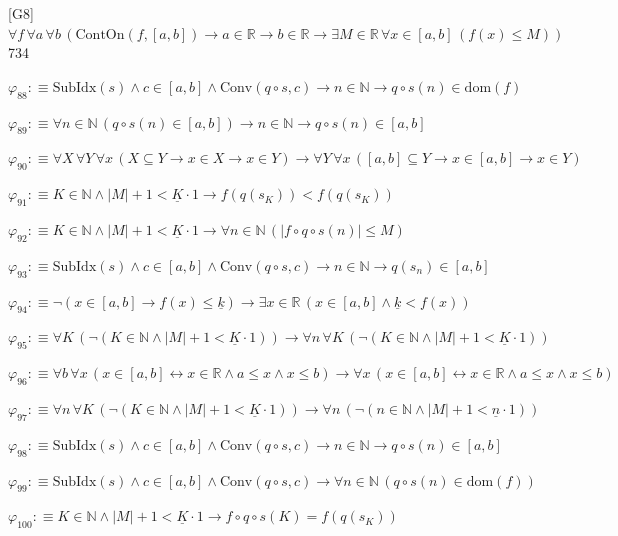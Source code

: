 \begin{fullproof}{[G8]}{$\forall f\,\forall a\,\forall b\,(\mathrm{ContOn}(f,[a,b]) \to a \in \mathbb{R} \to b \in \mathbb{R} \to \exists M \in \mathbb{R}\,\forall x \in [a,b]\,(f(x) \leq M))$}{734}
\begin{abbrevlist}
\item $\varphi_{88} :\equiv \mathrm{SubIdx}(s) \land c \in [a,b] \land \mathrm{Conv}(q \circ s,c) \to n \in \mathbb{N} \to q \circ s(n) \in \mathrm{dom}(f)$
\item $\varphi_{89} :\equiv \forall n \in \mathbb{N}\,(q \circ s(n) \in [a,b]) \to n \in \mathbb{N} \to q \circ s(n) \in [a,b]$
\item $\varphi_{90} :\equiv \forall X\,\forall Y\,\forall x\,(X \subseteq Y \to x \in X \to x \in Y) \to \forall Y\,\forall x\,([a,b] \subseteq Y \to x \in [a,b] \to x \in Y)$
\item $\varphi_{91} :\equiv K \in \mathbb{N} \land \lvert M \rvert + 1 < \underline{K} \cdot 1 \to f(q(s_{K})) < f(q(s_{K}))$
\item $\varphi_{92} :\equiv K \in \mathbb{N} \land \lvert M \rvert + 1 < \underline{K} \cdot 1 \to \forall n \in \mathbb{N}\,(\lvert f \circ q \circ s(n) \rvert \leq M)$
\item $\varphi_{93} :\equiv \mathrm{SubIdx}(s) \land c \in [a,b] \land \mathrm{Conv}(q \circ s,c) \to n \in \mathbb{N} \to q(s_{n}) \in [a,b]$
\item $\varphi_{94} :\equiv \neg (x \in [a,b] \to f(x) \leq \underline{k}) \to \exists x \in \mathbb{R}\,(x \in [a,b] \land \underline{k} < f(x))$
\item $\varphi_{95} :\equiv \forall K\,(\neg (K \in \mathbb{N} \land \lvert M \rvert + 1 < \underline{K} \cdot 1)) \to \forall n\,\forall K\,(\neg (K \in \mathbb{N} \land \lvert M \rvert + 1 < \underline{K} \cdot 1))$
\item $\varphi_{96} :\equiv \forall b\,\forall x\,(x \in [a,b] \leftrightarrow x \in \mathbb{R} \land a \leq x \land x \leq b) \to \forall x\,(x \in [a,b] \leftrightarrow x \in \mathbb{R} \land a \leq x \land x \leq b)$
\item $\varphi_{97} :\equiv \forall n\,\forall K\,(\neg (K \in \mathbb{N} \land \lvert M \rvert + 1 < \underline{K} \cdot 1)) \to \forall n\,(\neg (n \in \mathbb{N} \land \lvert M \rvert + 1 < \underline{n} \cdot 1))$
\item $\varphi_{98} :\equiv \mathrm{SubIdx}(s) \land c \in [a,b] \land \mathrm{Conv}(q \circ s,c) \to n \in \mathbb{N} \to q \circ s(n) \in [a,b]$
\item $\varphi_{99} :\equiv \mathrm{SubIdx}(s) \land c \in [a,b] \land \mathrm{Conv}(q \circ s,c) \to \forall n \in \mathbb{N}\,(q \circ s(n) \in \mathrm{dom}(f))$
\item $\varphi_{100} :\equiv K \in \mathbb{N} \land \lvert M \rvert + 1 < \underline{K} \cdot 1 \to f \circ q \circ s(K) = f(q(s_{K}))$

\end{abbrevlist}
\end{fullproof}
